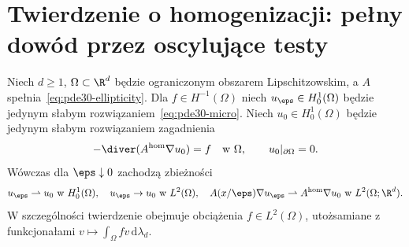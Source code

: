 \section{Twierdzenie o homogenizacji: pełny dowód przez oscylujące testy}
\begin{twierdzenie}
\label{thm:pde30-homogenization}
Niech $d\ge1$, $\Omega\subset\R^d$ będzie ograniczonym
obszarem Lipschitzowskim, a $A$ spełnia~\eqref{eq:pde30-ellipticity}.
Dla $f\in H^{-1}(\Omega)$ niech $u_\eps\in H_0^1(\Omega)$
będzie jedynym słabym rozwiązaniem~\eqref{eq:pde30-micro}.
Niech $u_0\in H_0^1(\Omega)$ będzie jedynym słabym
rozwiązaniem zagadnienia
\begin{equation}\label{eq:pde30-macro}
 -\diver(A^{\mathrm{hom}}\nabla u_0)=f
 \quad\text{w }\Omega,\qquad u_0|_{\partial\Omega}=0.
\end{equation}
Wówczas dla $\eps\downarrow0$ zachodzą zbieżności
\[
 u_\eps\rightharpoonup u_0\text{ w }H_0^1(\Omega),\quad
 u_\eps\to u_0\text{ w }L^2(\Omega),\quad
 A(x/\eps)\nabla u_\eps\rightharpoonup
 A^{\mathrm{hom}}\nabla u_0\text{ w }L^2(\Omega;\R^d).
\]
W szczególności twierdzenie obejmuje obciążenia
$f\in L^2(\Omega)$, utożsamiane z funkcjonałami
$v\mapsto\int_\Omega fv\,\mathrm d\lambda_d$.
\end{twierdzenie}
